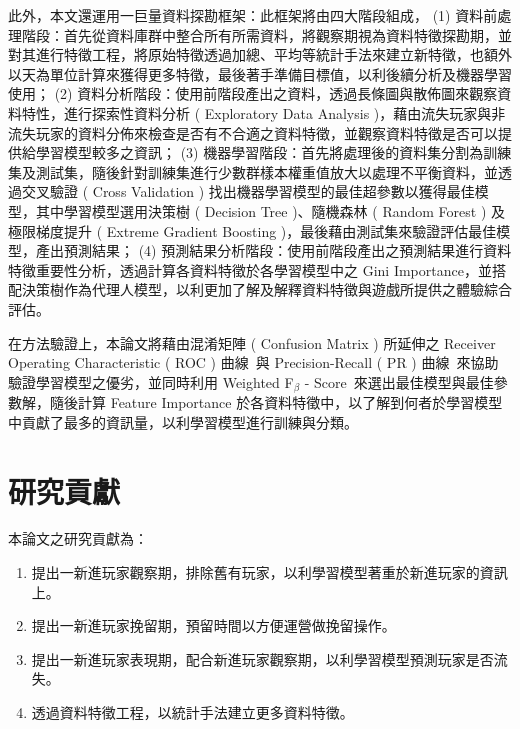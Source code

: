 此外，本文還運用一巨量資料探勘框架：此框架將由四大階段組成， (1) 資料前處理階段：首先從資料庫群中整合所有所需資料，將觀察期視為資料特徵探勘期，並對其進行特徵工程，將原始特徵透過加總、平均等統計手法來建立新特徵，也額外以天為單位計算來獲得更多特徵，最後著手準備目標值，以利後續分析及機器學習使用； (2) 資料分析階段：使用前階段產出之資料，透過長條圖與散佈圖來觀察資料特性，進行探索性資料分析 ( Exploratory Data Analysis )，藉由流失玩家與非流失玩家的資料分佈來檢查是否有不合適之資料特徵，並觀察資料特徵是否可以提供給學習模型較多之資訊； (3) 機器學習階段：首先將處理後的資料集分割為訓練集及測試集，隨後針對訓練集進行少數群樣本權重值放大以處理不平衡資料，並透過交叉驗證 ( Cross Validation ) 找出機器學習模型的最佳超參數以獲得最佳模型，其中學習模型選用決策樹 ( Decision Tree )、隨機森林 ( Random Forest ) 及極限梯度提升 ( Extreme Gradient Boosting )，最後藉由測試集來驗證評估最佳模型，產出預測結果； (4) 預測結果分析階段：使用前階段產出之預測結果進行資料特徵重要性分析，透過計算各資料特徵於各學習模型中之 Gini Importance，並搭配決策樹作為代理人模型，以利更加了解及解釋資料特徵與遊戲所提供之體驗綜合評估。

在方法驗證上，本論文將藉由混淆矩陣 ( Confusion Matrix ) 所延伸之 Receiver Operating Characteristic ( ROC ) 曲線~\cite{fawcett2006introduction}與 Precision-Recall ( PR ) 曲線~\cite{article}來協助驗證學習模型之優劣，並同時利用 Weighted F$_{\beta}$ - Score~\cite{Goutte2005API}來選出最佳模型與最佳參數解，隨後計算 Feature Importance 於各資料特徵中，以了解到何者於學習模型中貢獻了最多的資訊量，以利學習模型進行訓練與分類。
\newpage

\section{研究貢獻}

本論文之研究貢獻為：

\begin{enumerate}
    \item 提出一新進玩家觀察期，排除舊有玩家，以利學習模型著重於新進玩家的資訊上。
    \item 提出一新進玩家挽留期，預留時間以方便運營做挽留操作。
    \item 提出一新進玩家表現期，配合新進玩家觀察期，以利學習模型預測玩家是否流失。
    \item 透過資料特徵工程，以統計手法建立更多資料特徵。
\end{enumerate}


